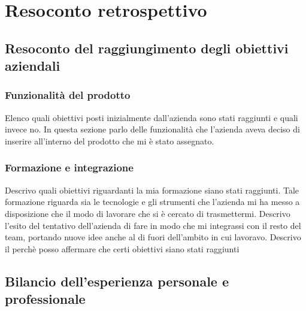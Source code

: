 \chapter{Resoconto retrospettivo}
	\section{Resoconto del raggiungimento degli obiettivi aziendali}
		\subsection{Funzionalità del prodotto}
			Elenco quali obiettivi posti inizialmente dall'azienda sono stati raggiunti e quali invece no. In questa sezione parlo delle
			funzionalità che l'azienda aveva deciso di inserire all'interno del prodotto che mi è stato assegnato.
		\subsection{Formazione e integrazione}
			Descrivo quali obiettivi riguardanti la mia formazione siano stati raggiunti. Tale formazione riguarda sia le tecnologie e
			gli strumenti che l'azienda mi ha messo a disposizione che il modo di lavorare che si è cercato di trasmettermi. Descrivo
			l'esito del tentativo dell'azienda di fare in modo che mi integrassi con il resto del team, portando nuove idee anche al di
			fuori dell'ambito in cui lavoravo. Descrivo il perchè posso affermare che certi obiettivi siano stati raggiunti
	\section{Bilancio dell'esperienza personale e professionale}
